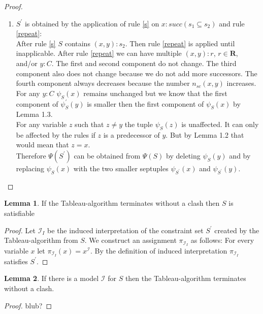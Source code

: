 \documentclass[a4paper,11pt]{scrartcl}
\theoremstyle{break}
\theoremstyle{definition}
\newtheorem{mylem}{Lemma}
\begin{document}
\begin{proof}
\begin{enumerate}
For any variable $z$ such that $z\neq y$. The tuple $\psi_S(z)$ is unaffected. It can only be affected by the rules if $z$ is a predecessor of $y$. But by Lemma 1.2 that would mean that $z=x$.\\
Altogether $\Psi(S^\prime)$ can be obtained from $\Psi(S)$ by replacing $\psi_S(x)$ with the two smaller tuples $\psi_{S^\prime}(x)$ and $\psi_{S^\prime}(y)$.
\item $S^\prime$ is obtained by the application of rule \ref{s} on $x:succ(s_1\subseteq s_2)$ and rule \ref{repeat}:\\ 
After rule \ref{s} $S$ contains $(x,y):s_2$. Then rule \ref{repeat} is applied until inapplicable. After rule \ref{repeat} we can have multiple $(x,y):r$, $r\in\mathbf{R}$, and/or $y:C$. The first and second component do not change. The third component also does not change because we do not add more successors. The fourth component always decreases because the number $n_{sc}(x,y)$ increases. For any $y:C$ $\psi_S(x)$ remains unchanged but we know that the first component of $\psi_S^\prime(y)$ is smaller then the first component of $\psi_S(x)$ by Lemma 1.3.\\
For any variable $z$ such that $z\neq y$ the tuple $\psi_S(z)$ is unaffected. It can only be affected by the rules if $z$ is a predecessor of $y$. But by Lemma 1.2 that would mean that $z=x$.\\
Therefore $\Psi(S^\prime)$ can be obtained from $\Psi(S)$ by deleting $\psi_S(y)$ and by replacing $\psi_S(x)$ with the two smaller septuples $\psi_{S^\prime}(x)$ and $\psi_{S^\prime}(y)$.
\end{enumerate}
\end{proof}
\begin{mylem}
If the Tableau-algorithm terminates without a clash then $S$ is satisfiable
\end{mylem}
\begin{proof}
Let $\mathcal{I}_I$ be the induced interpretation of the constraint set $S^\prime$ created by the Tableau-algorithm from $S$. We construct an assignment $\pi_{\mathcal{I}_I}$ as follows: For every variable $x$ let $\pi_{\mathcal{I}_I}(x)=x^\mathcal{I}$. By the definition of induced interpretation $\pi_{\mathcal{I}_I}$ satisfies $S^\prime$.
\end{proof}
\begin{mylem}
If there is a model $\mathcal{I}$ for $S$ then the Tableau-algorithm terminates without a clash.
\end{mylem}
\begin{proof}
blub?
\end{proof}
\end{document}
